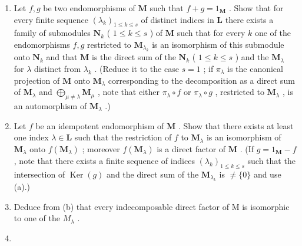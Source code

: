 \begin{enumerate}
\def\labelenumi{(\alph{enumi})}
\item
  Let \(f, g\) be two endomorphisms of \(\mathbf{M}\) such that \(f + g = 1_{\mathbf{M}}\) . Show that for every finite sequence \((\lambda_k)_{1 \leqslant k \leqslant s}\) of distinct indices in \(\mathbf{L}\) there exists a family of submodules \(\mathbf{N}_k\) ( \(1 \leqslant k \leqslant s\) ) of \(\mathbf{M}\) such that for every \(k\) one of the endomorphisms \(f, g\) restricted to \(\mathbf{M}_{\lambda_{k}}\) is an isomorphism of this submodule onto \(\mathbf{N}_k\) and that \(\mathbf{M}\) is the direct sum of the \(\mathbf{N}_k\) ( \(1 \leqslant k \leqslant s\) ) and the \(\mathbf{M}_{\lambda}\) for \(\lambda\) distinct from \(\lambda_k\) . (Reduce it to the case \(s = 1\) ; if \(\pi_{\lambda}\) is the canonical projection of \(\mathbf{M}\) onto \(\mathbf{M}_{\lambda}\) corresponding to the decomposition as a direct sum of \(\mathbf{M}_{\lambda}\) and \(\bigoplus_{\mu \neq \lambda} \mathbf{M}_{\mu}\) , note that either \(\pi_{\lambda} \circ f\) or \(\pi_{\lambda} \circ g\) , restricted to \(\mathbf{M}_{\lambda}\) , is an automorphism of \(\mathbf{M}_{\lambda}\) .)
\item
  Let \(f\) be an idempotent endomorphism of \(\mathbf{M}\) . Show that there exists at least one index \(\lambda \in \mathbf{L}\) such that the restriction of \(f\) to \(\mathbf{M}_{\lambda}\) is an isomorphism of \(\mathbf{M}_{\lambda}\) onto \(f(\mathbf{M}_{\lambda})\) ; moreover \(f(\mathbf{M}_{\lambda})\) is a direct factor of \(\mathbf{M}\) . (If \(g = 1_{\mathbf{M}} - f\) , note that there exists a finite sequence of indices \((\lambda_k)_{1 \leqslant k \leqslant s}\) such that the intersection of \(\operatorname{Ker}(g)\) and the direct sum of the \(\mathbf{M}_{\lambda_k}\) is \(\neq \{0\}\) and use (a).)
\item
  Deduce from (b) that every indecomposable direct factor of M is isomorphic to one of the \(M_{\lambda}\) .
\item

\end{enumerate}
